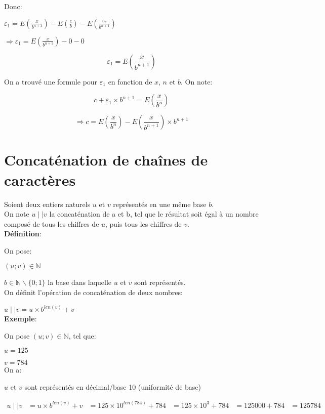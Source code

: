 \documentclass[a4paper, 12pt]{article}
\begin{document}
Donc:

$\varepsilon_{1} =
E \left( \frac{x}{b^{n+1}} \right) -
E \left( \frac{c}{b} \right) - 
E \left( \frac{\varepsilon_{2}}{b^{n+1}} \right)$

$\Rightarrow \varepsilon_{1} = E \left( \frac{x}{b^{n+1}} \right) - 0 - 0$

\[
\varepsilon_{1} = E \left( \frac{x}{b^{n+1}} \right)
\]

\noindent On a trouvé une formule pour $\varepsilon_{1}$ en fonction de $x$, $n$ et $b$. On note:

\[
c + \varepsilon_{1} \times b^{n+1} = E \left( \frac{x}{b^{n}} \right)
\]

\[
\Rightarrow c = E \left( \frac{x}{b^{n}} \right) - E \left( \frac{x}{b^{n+1}} \right) \times b^{n+1}
\]

\newpage

\section*{Concaténation de chaînes de caractères}
Soient deux entiers naturels $u$ et $v$ représentés en une même base $b$. \\
On note $u \mid\mid v$ la concaténation de a et b, tel que le résultat soit égal
à un nombre composé de tous les chiffres de $u$, puis tous les chiffres de $v$. \\

\noindent \textbf{Définition}:

On pose:

$\left( u; v \right) \in \mathbb{N}$

$b \in \mathbb{N} \backslash \{0; 1\}$ la base dans laquelle $u$ et $v$ sont représentés. \\

On définit l'opération de concaténation de deux nombres:

$u \mid\mid v = u \times b^{len \left( v \right)} + v$ \\

\noindent \textbf{Exemple}:

On pose $\left( u; v \right) \in \mathbb{N}$, tel que:

$u = 125$

$v = 784$ \\

On a:

$u$ et $v$ sont représentés en décimal/base 10 (uniformité de base)

\begin{align*}
	u \mid\mid v
	
	&= u \times b^{len \left( v \right)} + v
	
	&= 125 \times 10^{len \left( 784 \right)} + 784
	
	&= 125 \times 10^{3} + 784
	
	&= 125000 + 784
	
	&= 125784
\end{align*} \\
\end{document}
